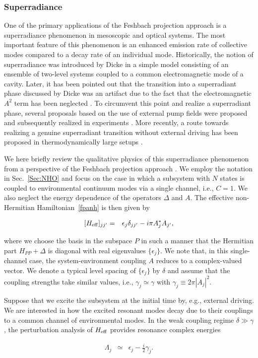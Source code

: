\documentclass{tADP2e}
\theoremstyle{plain}
\newcommand{\eqn}[1]{
\begin{eqnarray}
	#1
\end{eqnarray}
}
\theoremstyle{plain}
\theoremstyle{definition}
\begin{document}
\subsubsection{Superradiance}\label{Sec:spr}
One of the primary applications of the Feshbach projection approach is a superradiance phenomenon in mesoscopic and optical systems. The most important feature of this phenomenon is an enhanced emission rate of collective modes compared to a decay rate of an individual mode. Historically, the notion of superradiance was introduced by Dicke \cite{DRH54} in a simple model consisting of an ensemble of two-level systems coupled to a common electromagnetic mode of a cavity. Later, it has been pointed out that the transition into a superradiant phase discussed by Dicke was an artifact due to the fact that the electromagnetic $A^2$ term has been neglected \cite{RK75,NP10}. To circumvent this point and realize a superradiant phase, several proposals based on the use of external pump fields were proposed \cite{DF07,TEG13} and subsequently realized in experiments \cite{MC08,BK10,HC14}. More recently, a route towards realizing a genuine superradiant transition without external driving has  been proposed in thermodynamically large setups \cite{YA20}.

We here briefly review the qualitative physics of this superradiance phenomenon from a perspective of the Feshbach projection approach \cite{CGL09}. We employ the notation in {Sec.~\ref{Sec:NHO}} and focus on the case in which a subsystem with $N$ states is coupled to environmental continuum modes via a single channel, i.e., $C=1$. We also neglect the energy dependence of the operators $\Delta$ and $A$. The effective non-Hermitian Hamiltonian~\eqref{fpanh} is then  given by
\eqn{
[H_{{\rm eff}}]_{jj'} & = & \epsilon_{j}\delta_{jj'}-i\pi A^*_{j}A_{j'},
}  
where we choose the basis in the subspace $P$ in such a manner that the Hermitian part $H_{PP}+\Delta$ is diagonal with real eigenvalues $\{\epsilon_{j}\}$. We note that, in this single-channel case, the system-environment coupling $A$ reduces to a complex-valued vector. We denote a typical level spacing of $\{\epsilon_{j}\}$ by $\delta$ and assume that the coupling strengths take similar values, i.e., $\gamma_{j}\simeq\gamma$ with $\gamma_{j}\equiv 2\pi|A_{j}|^{2}$.  

Suppose that we excite the subsystem at the initial time by, e.g., external driving. We are interested in how the excited resonant modes decay due to their couplings to a common channel of environmental modes. In the weak coupling regime $\delta\gg\gamma$, the perturbation analysis of $H_{\rm eff}$ provides resonance complex energies 
\eqn{
\Lambda_{j} & \simeq & \epsilon_{j}-\frac{i}{2}\gamma_{j}.
}
\end{document}
